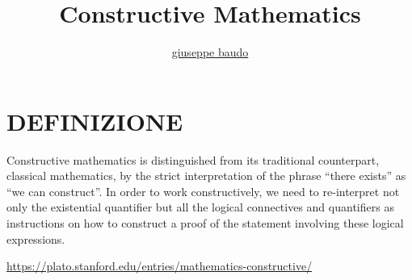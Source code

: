 \documentclass[a4paper,10pt]{article}
\title{Constructive Mathematics}
\author{\href{http://www.baudo.hol.es}{giuseppe baudo}}
\begin{document}
\maketitle

\section{DEFINIZIONE}
Constructive mathematics is distinguished from its traditional counterpart, classical mathematics, 
by the strict interpretation of the phrase “there exists” as “we can construct”. 
In order to work constructively, we need to re-interpret not only the existential quantifier but all the logical connectives and quantifiers as instructions on how to construct 
a proof of the statement involving these logical expressions. \cite{k1}

\begin{thebibliography}{100}
   \url{https://plato.stanford.edu/entries/mathematics-constructive/}
\end{thebibliography}
\end{document}
